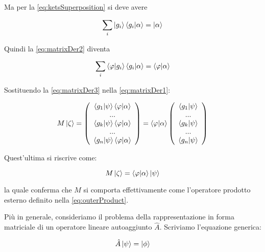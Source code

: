 Ma per la \eqref{eq:ketsSuperposition} si deve avere

	\begin{equation}
		\sum_i \ket{g_i} \braket{g_i}{\alpha} = \ket{\alpha}
	\end{equation}

Quindi la \eqref{eq:matrixDer2} diventa

	\begin{equation} \label{eq:matrixDer3}
		\sum_i \braket{\varphi}{g_i} \braket{g_i}{\alpha} = \braket{\varphi}{\alpha}
	\end{equation}

Sostituendo la \eqref{eq:matrixDer3} nella \eqref{eq:matrixDer1}:

	\begin{equation}
			M \ket{\zeta} = \left ( \begin{array}{c}
				\braket{g_1}{\psi} \braket{\varphi}{\alpha} \\
				... \\
				\braket{g_k}{\psi} \braket{\varphi}{\alpha} \\
				... \\
				\braket{g_n}{\psi} \braket{\varphi}{\alpha} \\
			\end{array}
		\right ) = \braket{\varphi}{\alpha} \left ( \begin{array}{c}
				\braket{g_1}{\psi} \\
				... \\
				\braket{g_k}{\psi} \\
				... \\
				\braket{g_n}{\psi} \\
			\end{array}
		\right )
	\end{equation}

Quest'ultima si riscrive come:

	\begin{equation}
		M \ket{\zeta} = \braket{\varphi}{\alpha} \ket{\psi}
	\end{equation}

la quale conferma che $M$ si comporta effettivamente come l'operatore prodotto esterno definito nella \eqref{eq:outerProduct}.

Più in generale, consideriamo il problema della rappresentazione in forma matriciale di un operatore lineare autoaggiunto $\hat{A}$. Scriviamo l'equazione generica:

	\begin{equation} \label{eq:operatorGeneric}
		\hat{A} \ket{\psi} = \ket{\phi}
	\end{equation}

